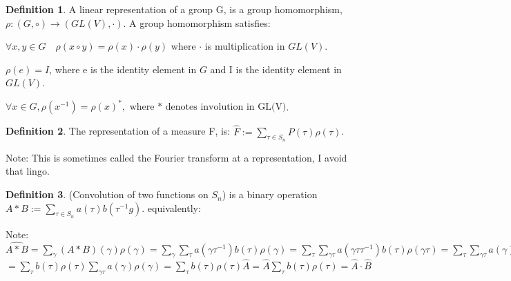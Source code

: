 \documentclass{article}
\theoremstyle{definition}
\newtheorem{definition}{Definition}
\begin{document}
\begin{definition} A linear representation of a group G, is a group homomorphism, $\rho : (G,\circ) \rightarrow (GL(V),\cdot)$. A group homomorphism satisfies:
\item \(\forall x,y \in G \quad \rho(x\circ y) = \rho(x) \cdot \rho(y) \) where $\cdot $ is multiplication in $GL(V)$.
\item \( \rho(e) = I \), where e is the identity element in $G$ and I is the identity element in $ GL(V) $.
\item \( \forall x \in G, \rho(x^{-1}) = \rho(x)^*, \text{ where * denotes involution in GL(V)} \).
\end{definition}

\begin{definition}The representation of a measure F, is: $ \hat{F} := \sum_{\tau \in S_n} P(\tau) \rho(\tau) $. \end{definition}
Note: This is sometimes called the Fourier transform at a representation, I avoid that lingo. 

\begin{definition}(Convolution of two functions on $S_n$) is a binary operation $ A * B := \sum_{\tau \in S_n} a(\tau) b(\tau^{-1}g) $. equivalently:
\end{definition}

Note: $ \widehat{A*B} = \sum_{\gamma} (A*B)(\gamma)\rho(\gamma) 
= \sum_{\gamma } \sum_{\tau} a(\gamma \tau^{-1})b(\tau)\rho(\gamma )
= \sum_{\tau} \sum_{\gamma\tau } a(\gamma\tau \tau^{-1})b(\tau)\rho(\gamma\tau )
= \sum_{\tau} \sum_{\gamma\tau } a(\gamma )b(\tau)\rho(\gamma)\rho(\tau ) $
$ = \sum_{\tau} b(\tau)\rho(\tau ) \sum_{\gamma\tau } a(\gamma )\rho(\gamma) 
= \sum_{\tau} b(\tau)\rho(\tau ) \hat{A}
= \hat{A} \sum_{\tau} b(\tau)\rho(\tau )
= \hat{A} \cdot \hat{B} $
\end{document}
